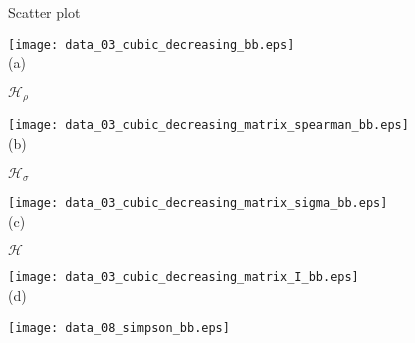 \documentclass[journal]{vgtc}                %
\begin{document}
\begin{figure*}[ht!]
    \centering

  \begin{minipage}{0.25\textwidth}
   \centering
     Scatter plot \\ \smallskip

     \hspace{-0.3cm} \texttt{[image: data\_03\_cubic\_decreasing\_bb.eps]}\\

   \hspace{0.27cm} \footnotesize (a) 
  \end{minipage}
  \hfill
  \begin{minipage}{0.23\textwidth}
   \centering
     $\mathcal{H}_{\rho}$ \\ \smallskip

     \texttt{[image: data\_03\_cubic\_decreasing\_matrix\_spearman\_bb.eps]}\\

   \hspace{-0.13cm} \footnotesize (b) 
  \end{minipage}
  \hfill
  \begin{minipage}{0.23\textwidth}
   \centering
        $\mathcal{H}_{\sigma}$ \\ \smallskip

     \texttt{[image: data\_03\_cubic\_decreasing\_matrix\_sigma\_bb.eps]}\\

   \hspace{-0.25cm} \footnotesize (c) 
  \end{minipage}
  \hfill
  \begin{minipage}{0.23\textwidth}
   \centering
     $\mathcal{H}$\\ \smallskip

     \texttt{[image: data\_03\_cubic\_decreasing\_matrix\_I\_bb.eps]}\\

   \hspace{-0.32cm} \footnotesize (d) 
  \end{minipage}
  
  \mbox{} \medskip
  

  \begin{minipage}{0.25\textwidth}
   \centering

     \hspace{-0.3cm} \texttt{[image: data\_08\_simpson\_bb.eps]}\\


\end{minipage}
\end{figure*}
\end{document}
